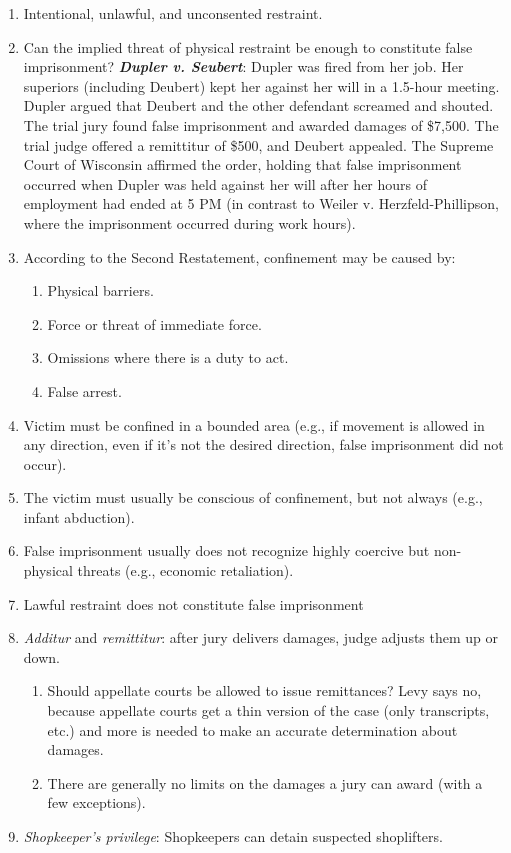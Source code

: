 \begin{enumerate}
    \item Intentional, unlawful, and unconsented restraint.
    \item Can the implied threat of physical restraint be enough to constitute false imprisonment? \textbf{\emph{Dupler v. Seubert}}: Dupler was fired from her job. Her superiors (including Deubert) kept her against her will in a 1.5-hour meeting. Dupler argued that Deubert and the other defendant screamed and shouted. The trial jury found false imprisonment and awarded damages of \$7,500. The trial judge offered a remittitur of \$500, and Deubert appealed. The Supreme Court of Wisconsin affirmed the order, holding that false imprisonment occurred when Dupler was held against her will after her hours of employment had ended at 5 PM (in contrast to Weiler v. Herzfeld-Phillipson, where the imprisonment occurred during work hours).
    \item According to the Second Restatement, confinement may be caused by:
    \begin{enumerate}
        \item Physical barriers.
        \item Force or threat of immediate force.
        \item Omissions where there is a duty to act.
        \item False arrest.
    \end{enumerate}
    \item Victim must be confined in a bounded area (e.g., if movement is allowed in any direction, even if it's not the desired direction, false imprisonment did not occur).
    \item The victim must usually be conscious of confinement, but not always (e.g., infant abduction).
    \item False imprisonment usually does not recognize highly coercive but non-physical threats (e.g., economic retaliation).
    \item Lawful restraint does not constitute false imprisonment
    \item \emph{Additur} and \emph{remittitur}: after jury delivers damages, judge adjusts them up or down.
    \begin{enumerate}
        \item Should appellate courts be allowed to issue remittances? Levy says no, because appellate courts get a thin version of the case (only transcripts, etc.) and more is needed to make an accurate determination about damages.
        \item There are generally no limits on the damages a jury can award (with a few exceptions).
    \end{enumerate}
    \item \emph{Shopkeeper's privilege}: Shopkeepers can detain suspected shoplifters.
\end{enumerate}

